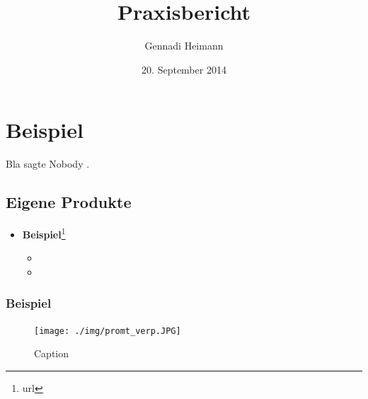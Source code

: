\documentclass[a4paper, 12pt]{extarticle}
\title{Praxisbericht}
\author{Gennadi Heimann}
\date{20. September 2014}
\begin{document}
\maketitle
\thispagestyle{empty}

\pagebreak

\pagestyle{scrheadings}
\ohead{\today}
\ofoot{\pagemark}
\setheadsepline{0.7pt}
\setfootsepline{0.7pt}

\tableofcontents

\pagebreak

\listoffigures

\pagebreak


\section{Beispiel}
Bla sagte Nobody \cite{felfernig1999intelligente}.
  
  \subsection{Eigene Produkte}
    
    \begin{itemize}
      \item \textbf{Beispiel}\footnote{url}
      \begin{itemize}
        \item
        \item 
      \end{itemize}
    \end{itemize}
  
    \subsubsection{Beispiel}
  

\pagebreak
{}

\begin{figure}[htbp]
  \centering
  \texttt{[image: ./img/promt\_verp.JPG]}
  \caption {Caption}
\end{figure}
   
\end{document}

